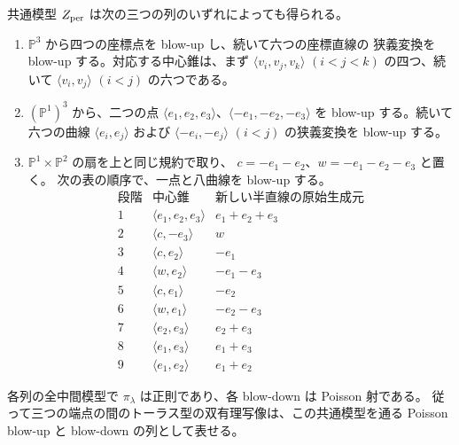 \begin{proposition}\label{prop:toric-explicit-blowups}
共通模型 $Z_{\rm per}$ は次の三つの列のいずれによっても得られる。
\begin{enumerate}
\item $\mathbb P^3$ から四つの座標点を blow-up し、続いて六つの座標直線の
狭義変換を blow-up する。対応する中心錐は、まず
$\langle v_i,v_j,v_k\rangle$ $(i<j<k)$ の四つ、続いて
$\langle v_i,v_j\rangle$ $(i<j)$ の六つである。
\item $(\mathbb P^1)^3$ から、二つの点
$\langle e_1,e_2,e_3\rangle$、$\langle-e_1,-e_2,-e_3\rangle$
を blow-up する。続いて六つの曲線
$\langle e_i,e_j\rangle$ および $\langle-e_i,-e_j\rangle$ $(i<j)$
の狭義変換を blow-up する。
\item $\mathbb P^1\times\mathbb P^2$ の扇を上と同じ規約で取り、
$c=-e_1-e_2$、$w=-e_1-e_2-e_3$ と置く。
次の表の順序で、一点と八曲線を blow-up する。
\[
\begin{array}{c|c|c}
 \text{段階}&\text{中心錐}&\text{新しい半直線の原始生成元}\\\hline
 1&\langle e_1,e_2,e_3\rangle&e_1+e_2+e_3\\
 2&\langle c,-e_3\rangle&w\\
 3&\langle c,e_2\rangle&-e_1\\
 4&\langle w,e_2\rangle&-e_1-e_3\\
 5&\langle c,e_1\rangle&-e_2\\
 6&\langle w,e_1\rangle&-e_2-e_3\\
 7&\langle e_2,e_3\rangle&e_2+e_3\\
 8&\langle e_1,e_3\rangle&e_1+e_3\\
 9&\langle e_1,e_2\rangle&e_1+e_2
\end{array}
\]
\end{enumerate}
各列の全中間模型で $\pi_\lambda$ は正則であり、各 blow-down は Poisson 射である。
従って三つの端点の間のトーラス型の双有理写像は、この共通模型を通る
Poisson blow-up と blow-down の列として表せる。
\end{proposition}
